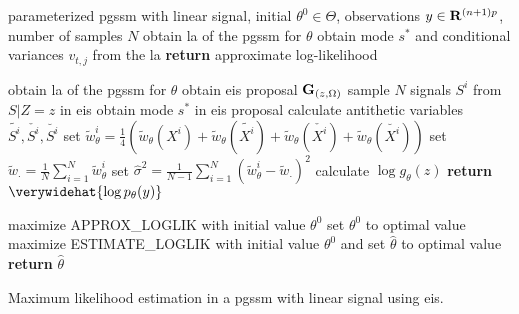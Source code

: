 \begin{algorithm}
    \label{alg:mle}
    \begin{algorithmic}[1]
        \Require parameterized \acrshort{pgssm} with linear signal, initial $\theta^{0} \in \Theta$, observations $y \in \mathbf R^{(n+1)p}$, number of samples $N$
            \State obtain \acrshort{la} of the \acrshort{pgssm} for $\theta$ 
            \State obtain mode $s^{\ast}$ and conditional variances $v_{t,j}$ from the \acrshort{la} 
            \State \textbf{return} approximate log-likelihood 
        \EndFunction 
        \Statex

            \State obtain \acrshort{la} of the \acrshort{pgssm} for $\theta$ 
            \State obtain \acrshort{eis} proposal $\mathbf G_{(z,\Omega)}$ 
            \State sample $N$ signals $S^{i}$ from $S|Z = z$ in \acrshort{eis} 
            \State obtain mode $s^{\ast}$ in \acrshort{eis} proposal 
            \State calculate antithetic variables $\tilde{S^{i}},\check{S^{i}}, \breve{{S^{i}}}$ 
            \State set $\tilde w_{\theta}^i = \frac{1}{4} \left( \tilde w_{\theta} (X^{i}) + \tilde w_{\theta}(\tilde{X^{i}}) + \tilde w_{\theta}(\check{X^{i}}) + \tilde w_{\theta}(\breve{{X^{i}}}) \right)$ 
            \State set $\tilde w_{\cdot} = \frac{1}{N}\sum_{i = 1}^N \tilde w^{i}_{\theta}$
            \State set $\hat \sigma^{2} = \frac{1}{N - 1} \sum_{i = 1}^N \left( \tilde w_{\theta}^{i} - \tilde w_{\cdot}\right)^{2}$
            \State calculate $\log g_{\theta}(z)$ 
            \State \textbf{return} $\verywidehat{\log p_{\theta}(y)}$ 
        \EndFunction
        \Statex

        \State maximize \textrm{APPROX\_LOGLIK} with initial value $\theta^{0}$  
        \State set $\theta^{0} $ to optimal value
        \State maximize \textrm{ESTIMATE\_LOGLIK} with initial value $\theta^{0}$ and   
        \State set $\hat \theta$ to optimal value
        \State \textbf{return} $\hat \theta $
    \end{algorithmic}
    \caption{Maximum likelihood estimation in a \acrshort{pgssm} with linear signal using \acrshort{eis}.}
\end{algorithm}


